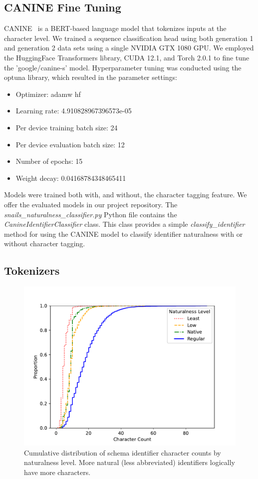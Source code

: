 \subsection{CANINE Fine Tuning}
CANINE~\cite{Clark-2022} is a BERT-based language model that tokenizes inputs at the character level. 
We trained a sequence classification head using both generation 1 and generation 2 data sets using a single NVIDIA GTX 1080 GPU. 
We employed the HuggingFace Transformers library, CUDA 12.1, and Torch 2.0.1 to fine tune the 'google/canine-s' model.
Hyperparameter tuning was conducted using the optuna library, which resulted in the parameter settings:
\begin{itemize}
  \item Optimizer: adamw hf 
  \item Learning rate: 4.910828967396573e-05
  \item Per device training batch size: 24
  \item Per device evaluation batch size: 12
  \item Number of epochs: 15
  \item Weight decay: 0.04168784348465411
\end{itemize}

Models were trained both with, and without, the character tagging feature.
We offer the evaluated models in our project repository.
The \emph{snails\_naturalness\_classifier.py} Python file contains the \emph{CanineIdentifierClassifier} class.
This class provides a simple \emph{classify\_identifier} method for using the CANINE model to classify identifier naturalness with or without character tagging.

\subsection{Tokenizers}

\begin{figure}[h]
  \centering
  \includegraphics[width=0.5\linewidth]{figures/identifier-char-count-cdf.pdf}
  \caption{Cumulative distribution of schema identifier character counts by naturalness level. More natural (less abbreviated) identifiers logically have more characters.}
  \label{fig:charcountcdf}
\end{figure}

